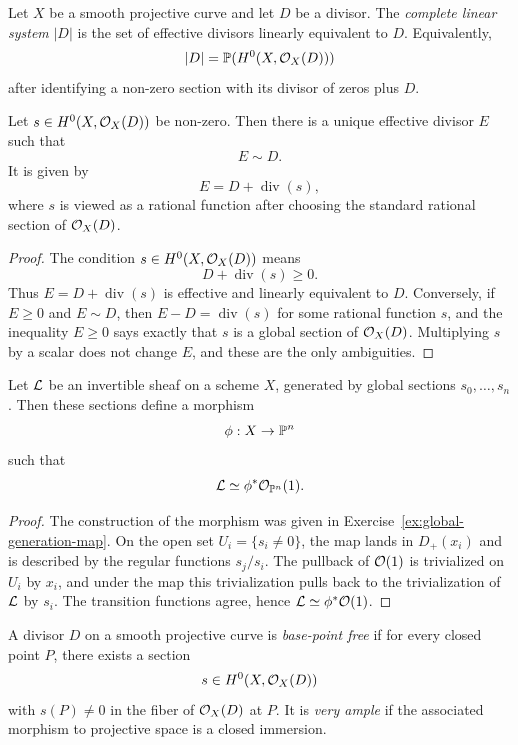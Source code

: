 \begin{definition}
Let \(X\) be a smooth projective curve and let \(D\) be a divisor.  The
\emph{complete linear system} \(|D|\) is the set of effective divisors linearly
equivalent to \(D\).  Equivalently,
\[
    |D|=\mathbb{P}(H^0(X,\mathcal{O}_X(D)))
\]
after identifying a non-zero section with its divisor of zeros plus \(D\).
\end{definition}

\begin{proposition}
Let \(s\in H^0(X,\mathcal{O}_X(D))\) be non-zero.  Then there is a unique effective
divisor \(E\) such that
\[
    E\sim D.
\]
It is given by
\[
    E=D+\operatorname{div}(s),
\]
where \(s\) is viewed as a rational function after choosing the standard
rational section of \(\mathcal{O}_X(D)\).
\end{proposition}

\begin{proof}
The condition \(s\in H^0(X,\mathcal{O}_X(D))\) means
\[
    D+\operatorname{div}(s)\ge0.
\]
Thus \(E=D+\operatorname{div}(s)\) is effective and linearly equivalent to
\(D\).  Conversely, if \(E\ge0\) and \(E\sim D\), then \(E-D=\operatorname{div}(s)\)
for some rational function \(s\), and the inequality \(E\ge0\) says exactly
that \(s\) is a global section of \(\mathcal{O}_X(D)\).  Multiplying \(s\) by a scalar
does not change \(E\), and these are the only ambiguities.
\end{proof}

\begin{proposition}
Let \(\mathcal{L}\) be an invertible sheaf on a scheme \(X\), generated by global
sections \(s_0,\ldots,s_n\).  Then these sections define a morphism
\[
    \phi:X\to\mathbb{P}^n
\]
such that
\[
    \mathcal{L}\simeq \phi^*\mathcal{O}_{\mathbb{P}^n}(1).
\]
\end{proposition}

\begin{proof}
The construction of the morphism was given in
Exercise~\ref{ex:global-generation-map}.  On the open set \(U_i=\{s_i\ne0\}\), the map
lands in \(D_+(x_i)\) and is described by the regular functions \(s_j/s_i\).
The pullback of \(\mathcal{O}(1)\) is trivialized on \(U_i\) by \(x_i\), and under the
map this trivialization pulls back to the trivialization of \(\mathcal{L}\) by \(s_i\).
The transition functions agree, hence \(\mathcal{L}\simeq\phi^*\mathcal{O}(1)\).
\end{proof}

\begin{definition}
A divisor \(D\) on a smooth projective curve is \emph{base-point free} if for
every closed point \(P\), there exists a section
\[
    s\in H^0(X,\mathcal{O}_X(D))
\]
with \(s(P)\ne0\) in the fiber of \(\mathcal{O}_X(D)\) at \(P\).  It is \emph{very
ample} if the associated morphism to projective space is a closed immersion.
\end{definition}

